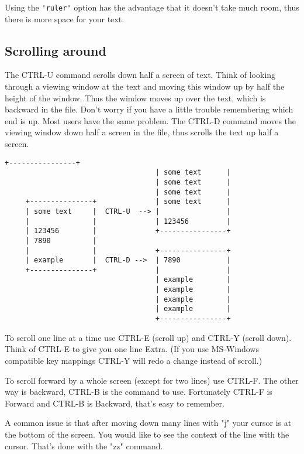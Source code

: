 Using the \verb!'ruler'! option has the advantage that it doesn't take much room,
thus there is more space for your text.

\subsection{Scrolling around}

The CTRL-U command scrolls down half a screen of text.
Think of looking through a viewing window at the text and moving this window up by half the height of the window.
Thus the window moves up over the text, which is backward in the file.
Don't worry if you have a little trouble remembering which end is up.
Most users have the same problem.
The CTRL-D command moves the viewing window down half a screen in the file, thus scrolls the text up half a screen.

\begin{Verbatim}[samepage=true]
                                    +----------------+
                                    | some text      |
                                    | some text      |
                                    | some text      |
     +---------------+              | some text      |
     | some text     |  CTRL-U  --> |                |
     |               |              | 123456         |
     | 123456        |              +----------------+
     | 7890          |
     |               |              +----------------+
     | example       |  CTRL-D -->  | 7890           |
     +---------------+              |                |
                                    | example        |
                                    | example        |
                                    | example        |
                                    | example        |
                                    +----------------+
\end{Verbatim}
 
To scroll one line at a time use CTRL-E (scroll up) and CTRL-Y (scroll down).
Think of CTRL-E to give you one line Extra.
(If you use MS-Windows compatible key mappings CTRL-Y will redo a change instead of scroll.)

To scroll forward by a whole screen (except for two lines) use CTRL-F.
The other way is backward, CTRL-B is the command to use.
Fortunately CTRL-F is Forward and CTRL-B is Backward, that's easy to remember.

A common issue is that after moving down many lines with "j" your cursor is at the bottom of the screen.
You would like to see the context of the line with the cursor.
That's done with the "zz" command.

